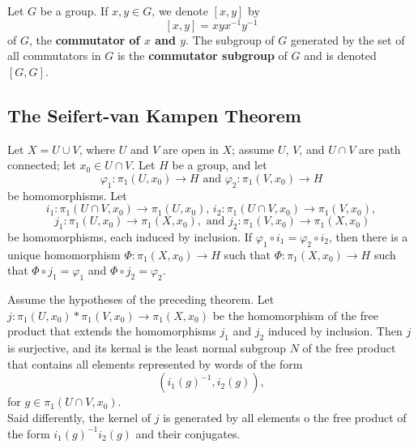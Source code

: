 \begin{definition}
Let $G$ be a group. If $x, y \in G$, we denote $[x, y]$ by
\[
    [x, y] = xyx^{-1}y^{-1}
\]
of $G$, the \textbf{commutator of $x$ and $y$}. The subgroup of $G$ generated by the set of all commutators in $G$ is the \textbf{commutator subgroup} of $G$ and is denoted $[G, G]$. 
\end{definition}

\subsection{The Seifert-van Kampen Theorem}

\begin{theorem}
Let $X = U \cup V$, where $U$ and $V$ are open in $X$; assume $U$, $V$, and $U \cap V$ are path connected; let $x_0 \in U \cap V$. Let $H$ be a group, and let
\[
    \varphi_1\colon \pi_1(U, x_0) \rightarrow H \text{ and } \varphi_2 \colon \pi_1(V, x_0) \rightarrow  H
\]
be homomorphisms. Let 
\[
    i_1 \colon \pi_1(U \cap V, x_0) \rightarrow \pi_1(U, x_0), \, i_2 \colon \pi_1(U \cap V, x_0) \rightarrow \pi_1(V, x_0), 
\]
\[
    \, j_1 \colon \pi_1(U, x_0) \rightarrow \pi_1(X, x_0), \text{ and } j_2\colon \pi_1(V, x_0) \rightarrow \pi_1(X, x_0)
\]
be homomorphisms, each induced by inclusion.
If $\varphi_1 \circ i_1 = \varphi_2 \circ i_2$, then there is a unique homomorphism $\Phi\colon \pi_1(X, x_0) \rightarrow H$ such that
$\Phi \colon \pi_1(X, x_0) \rightarrow H$ such that $\Phi \circ j_1 = \varphi_1$ and $\Phi \circ j_2 = \varphi_2$. 
\end{theorem}

\begin{theorem}
Assume the hypotheses of the preceding theorem. Let
$j\colon \pi_1(U, x_0) * \pi_1(V, x_0) \rightarrow \pi_1(X, x_0)$ be the homomorphism of the free product that extends the homomorphisms $j_1$ and $j_2$ induced by inclusion.
Then $j$ is surjective, and its kernal is the least normal subgroup $N$ of the free product that contains all elements represented by words of the form
\[
    (i_1(g)^{-1}, i_2(g)),
\]
for $g \in \pi_1(U \cap V, x_0)$. \\

Said differently, the kernel of $j$ is generated by all elements o the free product of the form $i_1(g)^{-1}i_2(g)$ and their conjugates.
\end{theorem}

